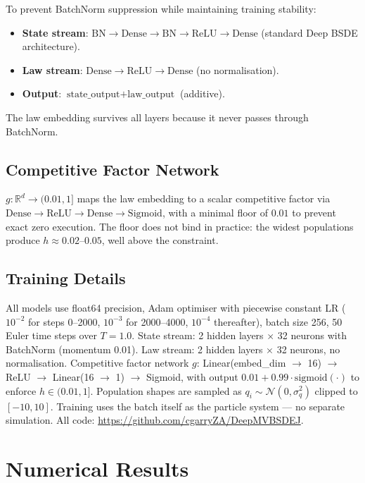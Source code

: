 \documentclass[11pt,a4paper]{article}
\newcommand{\R}{\mathbb{R}}
\begin{document}
To prevent BatchNorm suppression while maintaining training stability:
\begin{itemize}
  \item \textbf{State stream}: $\text{BN} \to \text{Dense} \to \text{BN} \to \text{ReLU} \to \text{Dense}$ (standard Deep BSDE architecture).
  \item \textbf{Law stream}: $\text{Dense} \to \text{ReLU} \to \text{Dense}$ (no normalisation).
  \item \textbf{Output}: $\text{state\_output} + \text{law\_output}$ (additive).
\end{itemize}

The law embedding survives all layers because it never passes through BatchNorm.

\subsection{Competitive Factor Network}

$g: \R^d \to (0.01, 1]$ maps the law embedding to a scalar competitive factor via $\text{Dense} \to \text{ReLU} \to \text{Dense} \to \text{Sigmoid}$, with a minimal floor of $0.01$ to prevent exact zero execution. The floor does not bind in practice: the widest populations produce $h \approx 0.02$--$0.05$, well above the constraint.

\subsection{Training Details}

All models use float64 precision, Adam optimiser with piecewise constant LR ($10^{-2}$ for steps 0--2000, $10^{-3}$ for 2000--4000, $10^{-4}$ thereafter), batch size 256, 50 Euler time steps over $T = 1.0$. State stream: 2 hidden layers $\times$ 32 neurons with BatchNorm (momentum 0.01). Law stream: 2 hidden layers $\times$ 32 neurons, no normalisation. Competitive factor network $g$: Linear(embed\_dim $\to$ 16) $\to$ ReLU $\to$ Linear(16 $\to$ 1) $\to$ Sigmoid, with output $0.01 + 0.99 \cdot \text{sigmoid}(\cdot)$ to enforce $h \in (0.01, 1]$. Population shapes are sampled as $q_i \sim \mathcal{N}(0, \sigma_q^2)$ clipped to $[-10, 10]$. Training uses the batch itself as the particle system --- no separate simulation. All code: \url{https://github.com/cgarryZA/DeepMVBSDEJ}.

\section{Numerical Results}
\label{sec:results}
\end{document}
